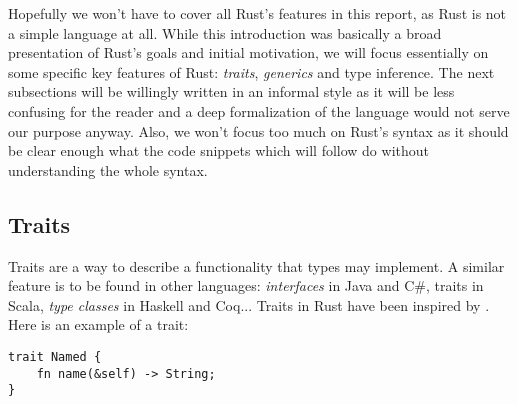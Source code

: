 \documentclass[twocolumn]{article}
\begin{document}
Hopefully we won't have to cover all Rust's features in this report, as Rust is not a simple language at all. While this introduction was basically a broad presentation of Rust's goals and initial motivation, we will focus essentially on some specific key features of Rust: \textit{traits}, \textit{generics} and type inference. The next subsections will be willingly written in an informal style as it will be less confusing for the reader and a deep formalization of the language would not serve our purpose anyway. Also, we won't focus too much on Rust's syntax as it should be clear enough what the code snippets which will follow do without understanding the whole syntax.

\subsection{Traits}
Traits are a way to describe a functionality that types may implement. A similar feature is to be found in other languages: \textit{interfaces} in Java and C\#, traits in Scala, \textit{type classes} in Haskell and Coq... Traits in Rust have been inspired by \cite{traits}. Here is an example of a trait:
\begin{verbatim}
trait Named {
    fn name(&self) -> String;
}
\end{verbatim}
\end{document}

